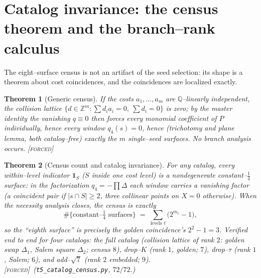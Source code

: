 \documentclass[11pt]{article}
\newtheorem{theorem}{Theorem}[section]
\theoremstyle{definition}
\newcommand{\Q}{\mathbb{Q}}
\newcommand{\Z}{\mathbb{Z}}
\newcommand{\forcedtag}{{\scshape [forced]}}
\begin{document}
\section{Catalog invariance: the census theorem and the branch--rank calculus}\label{sec:census}
The eight--surface census is not an artifact of the seed selection: its shape is a theorem about
cost coincidences, and the coincidences are localized exactly.

\begin{theorem}[Generic census]\label{thm:generic}
If the costs $a_1,\dots,a_m$ are $\Q$--linearly independent, the collision lattice
$\{d\in\Z^m:\sum d_ia_i=0,\ \sum d_i=0\}$ is zero; by the master identity the vanishing $q\equiv0$
then forces every monomial coefficient of $P$ individually, hence every window $q_4(s)=0$, hence
(trichotomy and plane lemma, both catalog--free) exactly the $m$ single--seed surfaces. No branch
analysis occurs. \forcedtag
\end{theorem}

\begin{theorem}[Census count and catalog invariance]\label{thm:countform}
For any catalog, every within--level indicator $\mathbf 1_S$ ($S$ inside one cost level) is a
nondegenerate constant--$\tfrac14$ surface: in the factorization $q_4=-\prod\Delta$ each window
carries a vanishing factor (a coincident pair if $|s\cap S|\ge2$, three collinear points on $X=0$
otherwise). When the necessity analysis closes, the census is exactly
\[
\#\{\text{constant--}\tfrac14\text{ surfaces}\}\;=\;\sum_{\text{levels }\ell}\bigl(2^{m_\ell}-1\bigr),
\]
so the ``eighth surface'' is precisely the golden coincidence's $2^2-1=3$. Verified end to end for
four catalogs: the full catalog (collision lattice of rank $2$: golden swap $\Delta_1$, Salem square
$\Delta_2$; census $8$), drop--$K$ (rank $1$, golden; $7$), drop--$\tau$ (rank $1$, Salem; $6$), and
add--$\sqrt7$ (rank $2$ embedded; $9$). \forcedtag\ (\texttt{t5\_catalog\_census.py}, $72/72$.)
\end{theorem}
\end{document}
